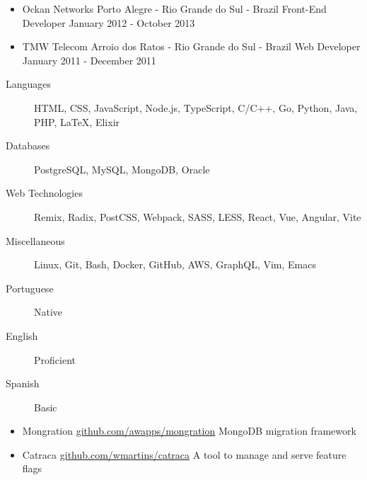 \documentclass[a4,11pt]{article}
\begin{document}
\begin{itemize}
        \item
            \ressubheading
                {Ockan Networks}
                {Porto Alegre - Rio Grande do Sul - Brazil}
                {Front-End Developer}
                {January 2012 - October 2013}

        \item
            \ressubheading
                {TMW Telecom}
                {Arroio dos Ratos - Rio Grande do Sul - Brazil}
                {Web Developer}
                {January 2011 - December 2011}
    \end{itemize}

    \begin{description}
        \item[Languages]
            HTML, CSS, JavaScript, Node.js, TypeScript, C/C++, Go, Python, Java, PHP, \LaTeX, Elixir
        \item[Databases]
            PostgreSQL, MySQL, MongoDB, Oracle
        \item[Web Technologies]
            Remix, Radix, PostCSS, Webpack, SASS, LESS, React, Vue, Angular, Vite
        \item[Miscellaneous]
            Linux, Git, Bash, Docker, GitHub, AWS, GraphQL, Vim, Emacs
    \end{description}

    \begin{description}
        \item[Portuguese] Native
        \item[English] Proficient
        \item[Spanish] Basic
    \end{description}

    \begin{itemize}
        \item
            \ressubheading
                {Mongration}
                {\href{https://github.com/awapps/mongration}{github.com/awapps/mongration}}
                {MongoDB migration framework}
                {}
        \item
            \ressubheading
                {Catraca}
                {\href{https://github.com/wmartins/catraca}{github.com/wmartins/catraca}}
                {A tool to manage and serve feature flags}
                {}
    \end{itemize}
\end{document}
